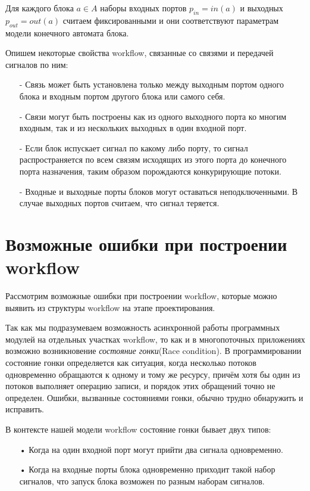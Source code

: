 \documentclass[a4paper,14pt]{article}
\begin{document}
Для каждого блока $a \in A$ наборы входных портов $p_{in} = in(a)$ и выходных $p_{out} = out(a)$ считаем фиксированными и они соответствуют параметрам модели конечного автомата блока. 

Опишем некоторые свойства workflow, связанные со связями и передачей сигналов по ним:
\begin{enumerate}
\item[-] Связь может быть установлена только между выходным портом одного блока и входным портом другого блока или самого себя.
\item[-] Связи могут быть построены как из одного выходного порта ко многим входным, так и из нескольких выходных в один входной порт.
\item[-] Если блок испускает сигнал по какому либо порту, то сигнал распространяется по всем связям исходящих из этого порта до конечного порта назначения, таким образом порождаются конкурирующие потоки.
\item[-] Входные и выходные порты блоков могут оставаться неподключенными. В случае выходных портов считаем, что сигнал теряется.
\end{enumerate}
 
\section{Возможные ошибки при построении workflow}
Рассмотрим возможные ошибки при построении workflow, которые можно выявить из структуры workflow на этапе проектирования. 

Так как мы подразумеваем возможность асинхронной работы программных модулей на отдельных участках workflow, то как и в многопоточных приложениях возможно возникновение \textit{состояние гонки}(Race condition). В программировании состояние гонки определяется как ситуация, когда несколько потоков  одновременно обращаются к одному и тому же ресурсу, причём хотя бы один из потоков выполняет операцию записи, и порядок этих обращений точно не определен. Ошибки, вызванные состояниями гонки, обычно трудно обнаружить и исправить.

В контексте нашей модели workflow состояние гонки бывает двух типов:
\begin{enumerate}
\item[•] Когда на один входной порт могут прийти два сигнала одновременно.
\item[•] Когда на входные порты блока одновременно приходит такой набор сигналов, что запуск блока возможен по разным наборам сигналов.
\end{enumerate}
\end{document}
